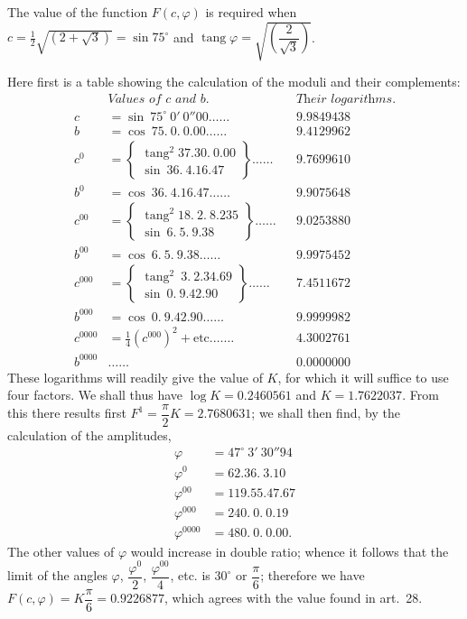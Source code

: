 \documentclass{article}
\begin{document}
The value of the function $F(c,\varphi)$ is required when $c=\frac{1}{2}\sqrt{(2+\sqrt{3})}=\sin75^{\circ}$ and $\operatorname{tang}\varphi=\sqrt{\left(\dfrac{2}{\sqrt{3}}\right)}$.


Here first is a table showing the calculation of the moduli and their complements:
\[ \begin{aligned} &\textit{Values of $c$ and $b$.} && \textit{Their logarithms.}\\ c&=\sin\ 75^{\circ}\ 0'\ 0''00\ldots\ldots && 9.9849438\\ b&=\cos\ 75.\ 0.\ 0.00\ldots\ldots && 9.4129962\\ c^{0}&=\left\{\begin{array}{l}\operatorname{tang}^{2}37.30.\ 0.00\\ \sin\ 36.\ 4.16.47\end{array}\right\}\ldots\ldots && 9.7699610\\ b^{0}&=\cos\ 36.\ 4.16.47\ldots\ldots && 9.9075648\\ c^{00}&=\left\{\begin{array}{l}\operatorname{tang}^{2}18.\ 2.\ 8.235\\ \sin\ 6.\ 5.\ 9.38\end{array}\right\}\ldots\ldots && 9.0253880\\ b^{00}&=\cos\ 6.\ 5.\ 9.38\ldots\ldots && 9.9975452\\ c^{000}&=\left\{\begin{array}{l}\operatorname{tang}^{2}\ 3.\ 2.34.69\\ \sin\ 0.\ 9.42.90\end{array}\right\}\ldots\ldots && 7.4511672\\ b^{000}&=\cos\ 0.\ 9.42.90\ldots\ldots && 9.9999982\\ c^{0000}&=\tfrac{1}{4}(c^{000})^{2}+\text{etc.}\ldots\ldots && 4.3002761\\ b^{0000}&\ldots\ldots && 0.0000000 \end{aligned} \]
These logarithms will readily give the value of $K$, for which it will suffice to use four factors. We shall thus have $\log K=0.2460561$ and $K=1.7622037$. From this there results first $F^{1}=\dfrac{\pi}{2}K=2.7680631$; we shall then find, by the calculation of the amplitudes,
\[ \begin{aligned} \varphi&=47^{\circ}\ 3'\ 30''94\\ \varphi^{0}&=62.36.\ 3.10\\ \varphi^{00}&=119.55.47.67\\ \varphi^{000}&=240.\ 0.\ 0.19\\ \varphi^{0000}&=480.\ 0.\ 0.00. \end{aligned} \]
The other values of $\varphi$ would increase in double ratio; whence it follows that the limit of the angles $\varphi$, $\dfrac{\varphi^{0}}{2}$, $\dfrac{\varphi^{00}}{4}$, etc. is $30^{\circ}$ or $\dfrac{\pi}{6}$; therefore we have $F(c,\varphi)=K\dfrac{\pi}{6}=0.9226877$, which agrees with the value found in art.~28.
\end{document}

